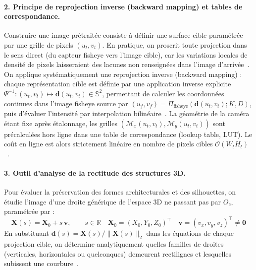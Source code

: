 \documentclass[11pt,a4paper]{article}
\renewcommand{\emph}[1]{\textup{#1}}
\begin{document}
\paragraph{2. Principe de reprojection inverse (\emph{backward mapping}) et tables de correspondance.}
Construire une image prétraitée consiste à définir une surface cible paramétrée par une grille de pixels $(u_t, v_t)$. En pratique, on proscrit toute projection dans le sens direct (du capteur fisheye vers l'image cible), car les variations locales de densité de pixels laisseraient des lacunes non renseignées dans l'image d'arrivée~\cite{wolberg1990}. On applique systématiquement une \emph{reprojection inverse} (\emph{backward mapping}) : chaque représentation cible est définie par une application inverse explicite $\Psi^{-1} : (u_t, v_t) \mapsto \mathbf{d}(u_t, v_t) \in \mathbb{S}^2$, permettant de calculer les coordonnées continues dans l'image fisheye source par $(u_f, v_f) = \Pi_{\mathrm{fisheye}}(\mathbf{d}(u_t, v_t); K, D)$, puis d'évaluer l'intensité par interpolation bilinéaire~\cite{wolberg1990,opencvfisheye}. La géométrie de la caméra étant fixe après étalonnage, les grilles $(\mathcal{M}_x(u_t, v_t), \mathcal{M}_y(u_t, v_t))$ sont précalculées hors ligne dans une \emph{table de correspondance} (\emph{lookup table}, LUT). Le coût en ligne est alors strictement linéaire en nombre de pixels cibles $\mathcal{O}(W_t H_t)$~\cite{opencvfisheye}.

\paragraph{3. Outil d'analyse de la rectitude des structures 3D.}
Pour évaluer la préservation des formes architecturales et des silhouettes, on étudie l'image d'une droite générique de l'espace 3D ne passant pas par $O_c$, paramétrée par :
\begin{equation}
  \mathbf{X}(s) = \mathbf{X}_0 + s\,\mathbf{v}, \qquad s \in \mathbb{R} \quad \mathbf{X}_0 = (X_0, Y_0, Z_0)^\top \quad \mathbf{v} = (v_x, v_y, v_z)^\top \neq \mathbf{0}
\end{equation}
En substituant $\mathbf{d}(s) = \mathbf{X}(s)/\|\mathbf{X}(s)\|_2$ dans les équations de chaque projection cible, on détermine analytiquement quelles familles de droites (verticales, horizontales ou quelconques) demeurent rectilignes et lesquelles subissent une courbure~\cite{snyder1987}.
\end{document}
